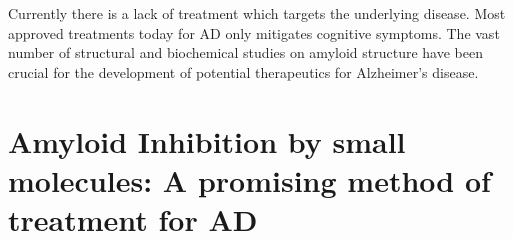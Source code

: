 Currently there is a lack of treatment which targets the underlying disease. Most approved treatments today for AD only mitigates cognitive symptoms.  The vast number of structural and biochemical studies on amyloid structure have been crucial for the development of potential therapeutics for Alzheimer's disease.




\section{Amyloid Inhibition by small molecules: A promising method of treatment for AD}

	



